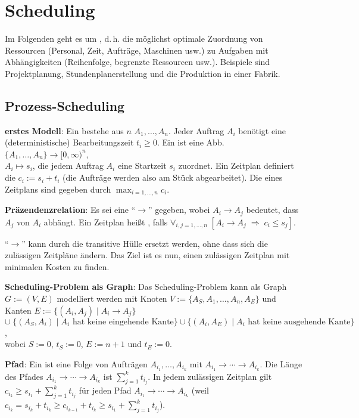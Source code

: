 \chapter{%
    Scheduling%
}

Im Folgenden geht es um , d.\,h. die möglichst optimale Zuordnung von
Ressourcen (Personal, Zeit, Aufträge, Maschinen usw.) zu Aufgaben mit
Abhängigkeiten (Reihenfolge, begrenzte Ressourcen usw.).
Beispiele sind Projektplanung, Stundenplanerstellung und die Produktion in einer Fabrik.

\section{%
    Prozess-Scheduling%
}

\textbf{erstes Modell}:
Ein  bestehe aus $n$  $A_1, \dotsc, A_n$.
Jeder Auftrag $A_i$ benötigt eine (deterministische) Bearbeitungszeit $t_i \ge 0$.
Ein  ist eine Abb. $\{A_1, \dotsc, A_n\} \to [0, \infty)^n$,\\
$A_i \mapsto s_i$, die jedem Auftrag $A_i$ eine Startzeit $s_i$ zuordnet.
Ein Zeitplan definiert die  $c_i := s_i + t_i$
(die Aufträge werden also am Stück abgearbeitet).
Die  eines Zeitplans sind gegeben durch $\max_{i=1,\dotsc,n} c_i$.

\textbf{Präzendenzrelation}:
Es sei eine  "`$\to$"' gegeben,
wobei $A_i \to A_j$ bedeutet, dass $A_j$ von $A_i$ abhängt.
Ein Zeitplan heißt , falls
$\forall_{i,j=1,\dotsc,n}\; [A_i \to A_j \;\Rightarrow\; c_i \le s_j]$.

"`$\to$"' kann durch die transitive Hülle ersetzt werden, ohne dass sich die zulässigen
Zeitpläne ändern.
Das Ziel ist es nun, einen zulässigen Zeitplan mit minimalen Kosten zu finden.

\linie

\textbf{Scheduling-Problem als Graph}:
Das Scheduling-Problem kann als Graph $G := (V, E)$ modelliert werden mit Knoten
$V := \{A_S, A_1, \dotsc, A_n, A_E\}$ und Kanten
$E := \{(A_i, A_j) \;|\; A_i \to A_j\}$\\
$\cup\; \{(A_S, A_i) \;|\; \text{$A_i$ hat keine eingehende Kante}\} \cup
\{(A_i, A_E) \;|\; \text{$A_i$ hat keine ausgehende Kante}\}$,\\
wobei $S := 0$, $t_S := 0$, $E := n+1$ und $t_E := 0$.

\textbf{Pfad}:
Ein  ist eine Folge von Aufträgen $A_{i_1}, \dotsc, A_{i_k}$ mit
$A_{i_1} \to \dotsb \to A_{i_k}$.
Die Länge des Pfades $A_{i_1} \to \dotsb \to A_{i_k}$ ist
$\sum_{j=1}^k t_{i_j}$.
In jedem zulässigen Zeitplan gilt $c_{i_k} \ge s_{i_1} + \sum_{j=1}^k t_{i_j}$
für jeden Pfad $A_{i_1} \to \dotsb \to A_{i_k}$
(weil $c_{i_k} = s_{i_k} + t_{i_k} \ge c_{i_{k-1}} + t_{i_k} \ge s_{i_1} + \sum_{j=1}^k t_{i_j}$).

